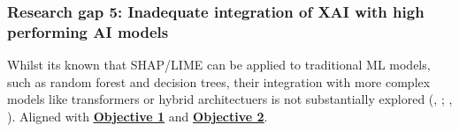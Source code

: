 
\subsubsection*{Research gap 5: Inadequate integration of XAI with high performing AI models}\label{research-gap-5}
Whilst its known that SHAP/LIME can be applied to traditional ML models, such as random forest and decision trees, their integration with more complex models like transformers or hybrid architectuers is not substantially explored (\citeauthor{alzahrani2024explainable}, \citeyear{alzahrani2024explainable}; \citeauthor{lim2025explicate}, \citeyear{lim2025explicate}). Aligned with \hyperref[objective-1]{\uline{\textbf{Objective 1}}} and \hyperref[objective-2]{\uline{\textbf{Objective 2}}}.

